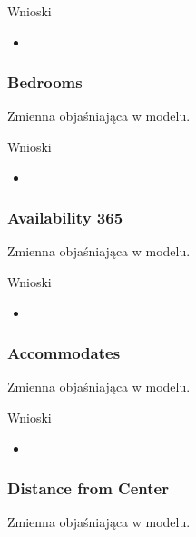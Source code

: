 

Wnioski

\begin{itemize}
    \item
\end{itemize}

\subsubsection{Bedrooms}\label{subsubsec:bedrooms}
Zmienna objaśniająca w modelu.



Wnioski

\begin{itemize}
    \item
\end{itemize}

\subsubsection{Availability 365}\label{subsubsec:availability-365}
Zmienna objaśniająca w modelu.


Wnioski

\begin{itemize}
    \item
\end{itemize}

\subsubsection{Accommodates}\label{subsubsec:accommodates}
Zmienna objaśniająca w modelu.



Wnioski

\begin{itemize}
    \item
\end{itemize}

\subsubsection{Distance from Center}\label{subsubsec:distance-from-center}
Zmienna objaśniająca w modelu.

